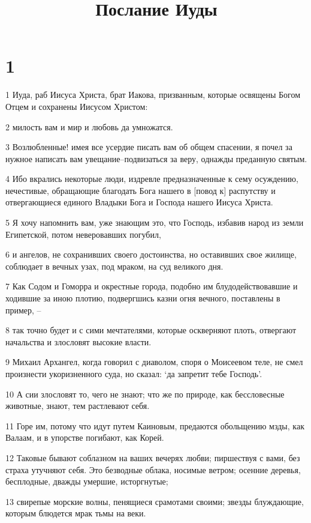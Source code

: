 

\title{Послание Иуды}


\chapter{1}

\par 1 Иуда, раб Иисуса Христа, брат Иакова, призванным, которые освящены Богом Отцем и сохранены Иисусом Христом:
\par 2 милость вам и мир и любовь да умножатся.
\par 3 Возлюбленные! имея все усердие писать вам об общем спасении, я почел за нужное написать вам увещание--подвизаться за веру, однажды преданную святым.
\par 4 Ибо вкрались некоторые люди, издревле предназначенные к сему осуждению, нечестивые, обращающие благодать Бога нашего в [повод к] распутству и отвергающиеся единого Владыки Бога и Господа нашего Иисуса Христа.
\par 5 Я хочу напомнить вам, уже знающим это, что Господь, избавив народ из земли Египетской, потом неверовавших погубил,
\par 6 и ангелов, не сохранивших своего достоинства, но оставивших свое жилище, соблюдает в вечных узах, под мраком, на суд великого дня.
\par 7 Как Содом и Гоморра и окрестные города, подобно им блудодействовавшие и ходившие за иною плотию, подвергшись казни огня вечного, поставлены в пример, --
\par 8 так точно будет и с сими мечтателями, которые оскверняют плоть, отвергают начальства и злословят высокие власти.
\par 9 Михаил Архангел, когда говорил с диаволом, споря о Моисеевом теле, не смел произнести укоризненного суда, но сказал: `да запретит тебе Господь'.
\par 10 А сии злословят то, чего не знают; что же по природе, как бессловесные животные, знают, тем растлевают себя.
\par 11 Горе им, потому что идут путем Каиновым, предаются обольщению мзды, как Валаам, и в упорстве погибают, как Корей.
\par 12 Таковые бывают соблазном на ваших вечерях любви; пиршествуя с вами, без страха утучняют себя. Это безводные облака, носимые ветром; осенние деревья, бесплодные, дважды умершие, исторгнутые;
\par 13 свирепые морские волны, пенящиеся срамотами своими; звезды блуждающие, которым блюдется мрак тьмы на веки.
